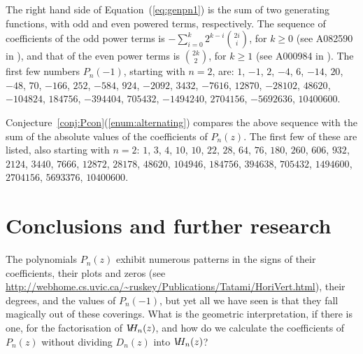 \documentclass[12pt]{amsart}
\newcommand{\conref}[1]{Conjecture~\ref{conj:#1}}
\newcommand{\eref}[1]{Equation~(\ref{eq:#1})}
\newcommand{\vh}{V\hspace{-5pt}H}
\begin{document}
The right hand side of \eref{genpn1} is the sum of two generating
functions, with odd and even powered terms, respectively.  The
sequence of coefficients of the odd power terms is $-\sum_{i=0}^{k}
2^{k-i}\binom{2i}{i}$, for $k\ge 0$ (see A082590 in \cite{Sloane}),
and that of the even power terms is $\binom{2k}{2}$, for $k\ge 1$ (see
A000984 in \cite{Sloane}).  The first few numbers $P_n(-1)$, starting
with $n=2$, are: $1$, $-1$, $ 2$, $ -4$, $ 6$, $ -14$, $ 20$, $ -48$,
$ 70$, $ -166$, $ 252$, $ -584$, $ 924$, $ -2092$, $ 3432$, $ -7616$,
$ 12870$, $ -28102$, $ 48620$, $ -104824$, $ 184756$, $ -394404$, $
705432$, $ -1494240$, $ 2704156$, $ -5692636$, $ 10400600$.

\conref{Pcon}(\ref{enum:alternating}) compares the above sequence with the sum of the
absolute values of the coefficients of $P_n(z)$.  The first few of
these are listed, also starting with $n=2$: $1$, $ 3$, $ 4$, $ 10$, $
10$, $ 22$, $ 28$, $ 64$, $ 76$, $ 180$, $ 260$, $ 606$, $ 932$, $
2124$, $ 3440$, $ 7666$, $ 12872$, $ 28178$, $ 48620$, $ 104946$, $
184756$, $ 394638$, $ 705432$, $ 1494600$, $ 2704156$, $ 5693376$, $
10400600$.



% 



%


\section{Conclusions and further research}
\label{sec:conclusion}
The polynomials $P_n(z)$ exhibit numerous patterns in the signs of
their coefficients, their plots and zeros (see
\url{http://webhome.cs.uvic.ca/~ruskey/Publications/Tatami/HoriVert.html}),
their degrees, and the values of $P_n(-1)$, but yet all we have seen
is that they fall magically out of these coverings.  What is the
geometric interpretation, if there is one, for the factorisation of
$\vh_n(z)$, and how do we calculate the coefficients of $P_n(z)$
without dividing $D_n(z)$ into $\vh_n(z)$?
\end{document}
